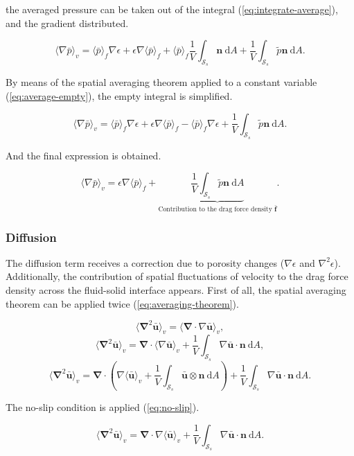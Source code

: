 \documentclass[a4paper,11pt]{article}
\begin{document}
the averaged pressure can be taken out of the integral (\autoref{eq:integrate-average}), and the gradient distributed.

$$\langle\nabla\bar p\rangle_v = \langle\bar p\rangle_f \nabla \epsilon + \epsilon\nabla\langle\bar p\rangle_f + \langle\bar p\rangle_f\frac{1}{V}\int_{\mathcal S_s} \bm n~\mathrm dA + \frac{1}{V}\int_{\mathcal S_s}\tilde p\bm n~\mathrm dA.$$

By means of the spatial averaging theorem applied to a constant variable (\autoref{eq:average-empty}), the empty integral is simplified.

$$\langle\nabla\bar p\rangle_v = \langle\bar p\rangle_f \nabla \epsilon + \epsilon\nabla\langle\bar p\rangle_f - \langle\bar p\rangle_f\nabla\epsilon + \frac{1}{V}\int_{\mathcal S_s}\tilde p\bm n~\mathrm dA.$$

And the final expression is obtained.

$$\boxed{\langle\nabla\bar p\rangle_v = \epsilon \nabla\langle\bar p\rangle_f + \underbrace{\frac{1}{V}\int_{\mathcal S_s}\tilde p\bm n~\mathrm dA}_{\text{Contribution to the drag force density }\bm{\bar f}}.}$$

\subsubsection{Diffusion}

The diffusion term receives a correction due to porosity changes (${\nabla\epsilon}$ and ${\nabla^2\epsilon}$).
Additionally, the contribution of spatial fluctuations of velocity to the drag force density across the fluid-solid interface appears.
First of all, the spatial averaging theorem can be applied twice (\autoref{eq:averaging-theorem}).

$$\langle\bm\nabla^2\bm{\bar u}\rangle_v = \langle\bm\nabla\cdot\nabla\bm{\bar u}\rangle_v,$$
$$\langle\bm\nabla^2\bm{\bar u}\rangle_v = \bm\nabla\cdot\langle\nabla\bm{\bar u}\rangle_v + \frac{1}{V}\int_{\mathcal S_s}\nabla\bm{\bar u}\cdot \bm n~\mathrm dA,$$
$$\langle\bm\nabla^2\bm{\bar u}\rangle_v = \bm\nabla\cdot\left(\nabla\langle\bm{\bar u}\rangle_v+\frac{1}{V}\int_{\mathcal S_s}\bm{\bar u}\otimes\bm n~\mathrm dA\right) + \frac{1}{V}\int_{\mathcal S_s}\nabla\bm{\bar u}\cdot \bm n~\mathrm dA.$$

The no-slip condition is applied (\autoref{eq:no-slip}).

$$\langle\bm\nabla^2\bm{\bar u}\rangle_v = \bm\nabla\cdot\nabla\langle\bm{\bar u}\rangle_v + \frac{1}{V}\int_{\mathcal S_s}\nabla\bm{\bar u}\cdot \bm n~\mathrm dA.$$
\end{document}
